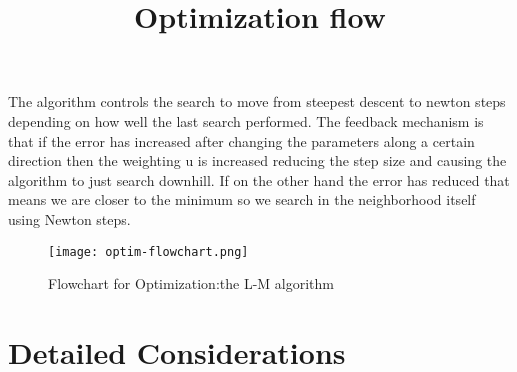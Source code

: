 \documentclass[titlepage]{article}
\begin{document}
\title{Optimization flow}
The algorithm controls the search to move from steepest descent to newton steps depending on how well the last search performed. The feedback mechanism is that if the error has increased after changing the parameters along a certain direction then the weighting u is increased reducing the step size and causing the algorithm to just search downhill. If on the other hand the error has reduced that means we are closer to the minimum so we search in the neighborhood itself using Newton steps.
\begin{wrapfigure}{R}{5.5cm}
  \label{Optim_Flow}
  \caption{Flowchart for Optimization:the L-M algorithm}\label{wrap-fig:1}
  \texttt{[image: optim-flowchart.png]}
\end{wrapfigure} 
\section{Detailed Considerations}
\end{document}
